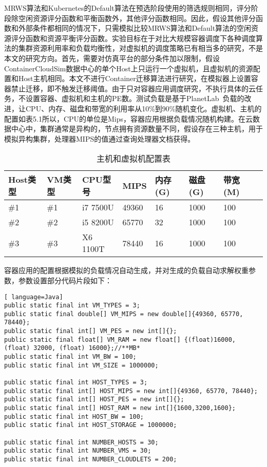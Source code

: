 MRWS算法和Kubernetes的Default算法在预选阶段使用的筛选规则相同，评分阶段除空闲资源评分函数和平衡函数外，其他评分函数相同。因此，假设其他评分函数和外部条件都相同的情况下，只需模拟比较MRWS算法和Default算法的空闲资源评分函数和资源平衡评分函数。实验目标在于对比大规模容器调度下各种调度算法的集群资源利用率和负载均衡性，对虚拟机的调度策略已有相当多的研究，不是本文的研究方向。首先，需要对仿真平台的部分条件加以限制，假设ContainerCloudSim数据中心的单个Host上只运行一个虚拟机，且虚拟机的资源配置和Host主机相同。本文不进行Container迁移算法进行研究，在模拟器上设置容器禁止迁移，即不触发迁移阈值。由于只对容器应用调度研究，不执行具体的云任务，不设置容器、虚拟机和主机的PE数。测试负载是基于PlanetLab~\cite{Park2006CoMon}负载的改进，让CPU、内存、磁盘和带宽的利用率从10\%到90\%随机变化。虚拟机、主机的配置如表5.1所以，CPU的单位是Mips，容器应用根据负载情况随机构建。在云数据中心中，集群通常是异构的，节点拥有资源数量不同，假设存在三种主机，用于模拟异构集群，处理器MIPS的值通过查询处理器文档获得。
\begin{table}[H]
	\centering\dawu[1.3]
	\caption{主机和虚拟机配置表}
	\begin{tabular}{|p{1.8cm}<{\centering}|p{1.5cm}<{\centering}|p{2cm}<{\centering}|p{1.5cm}<{\centering}|p{1.5cm}<{\centering}|p{1.5cm}<{\centering}|p{1.5cm}<{\centering}|p{1.5cm}<{\centering}|} \hline
		Host类型 & VM类型 & CPU型号 & MIPS & 内存(G) & 磁盘(G) & 带宽(M) \\ \hline
		\#1 & \#1 & i7 7500U & 49360 & 16 & 1000  & 100 \\ \hline
		\#2 & \#2 & i5 8200U & 65770 & 32 & 1000 & 100 \\ \hline
		\#3 & \#3 & X6 1100T & 78440 & 16 & 1000 & 100 \\ \hline
	\end{tabular}
\end{table}

容器应用的配置根据模拟的负载情况自动生成，并对生成的负载自动求解权重参数，参数设置部分代码片段如下：
\begin{lstlisting}[ language=Java]
public static final int VM_TYPES = 3;
public static final double[] VM_MIPS = new double[]{49360, 65770, 78440};
public static final int[] VM_PES = new int[]{};
public static final float[] VM_RAM = new float[] {(float)16000, (float) 32000, (float) 16000};//**MB*
public static final int VM_BW = 100;
public static final int VM_SIZE = 1000000;

public static final int HOST_TYPES = 3;
public static final int[] HOST_MIPS = new int[]{49360, 65770, 78440};
public static final int[] HOST_PES = new int[]{};
public static final int[] HOST_RAM = new int[]{1600,3200,1600};
public static final int HOST_BW = 100;
public static final int HOST_STORAGE = 1000000;

public static final int NUMBER_HOSTS = 30;
public static final int NUMBER_VMS = 30;
public static final int NUMBER_CLOUDLETS = 200;
\end{lstlisting}

